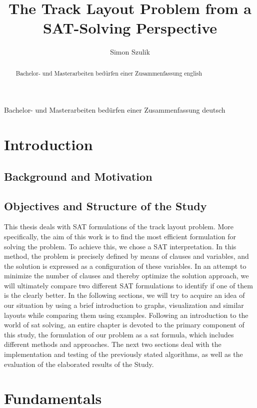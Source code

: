 \documentclass[bachelor, english]{algothesis}
\title{The Track Layout Problem from a SAT-Solving Perspective} %
\author{Simon Szulik} %
\begin{document}
\begin{abstract}
	Bachelor- und Masterarbeiten bedürfen einer Zusammenfassung english
\end{abstract}

\begin{germanabstract}
	Bachelor- und Masterarbeiten bedürfen einer Zusammenfassung deutsch
\end{germanabstract}

\thesistableofcontents

\chapter{Introduction}

\section{Background and Motivation}

\section{Objectives and Structure of the Study}
This thesis deals with SAT formulations of the track layout problem. More specifically, the aim of this work is to find the most efficient formulation for solving the problem. To achieve this, we chose a SAT interpretation. In this method, the problem is precisely defined by means of clauses and variables, and the solution is expressed as a configuration of these variables. In an attempt to minimize the number of clauses and thereby optimize the solution approach, we will ultimately compare two different SAT formulations to identify if one of them is the clearly better. In the following sections, we will try to acquire an idea of our situation by using a brief introduction to graphs, visualization and similar layouts while comparing them using examples. Following an introduction to the world of sat solving, an entire chapter is devoted to the primary component of this study, the formulation of our problem as a sat formula, which includes different methods and approaches. The next two sections deal with the implementation and testing of the previously stated algorithms, as well as the evaluation of the elaborated results of the Study.

\chapter{Fundamentals}
\end{document}
